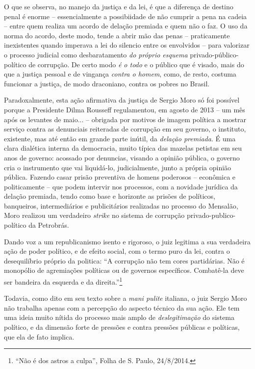 O que se observa, no manejo da justiça e da lei, é que a diferença de
destino penal é enorme -- essencialmente a possibiidade de não cumprir a
pena na cadeia -- entre quem realiza um acordo de delação premiada e
quem não o faz. O uso da norma do acordo, deste modo, tende a abrir mão
das penas -- praticamente inexistentes quando imperava a lei do silencio
entre os envolvidos -- para valorizar o processo judicial como
desbaratamento \emph{do próprio esquema} privado-público-político de
corrupção. De certo modo \emph{é o todo} e o público que é visado, mais
do que a justiça pessoal e de vingança \emph{contra o homem}, como, de
resto, costuma funcionar a justiça, de modo draconiano, contra os pobres
no Brasil.

Paradoxalmente, esta ação afirmativa da justiça de Sergio Moro só foi
possível porque a Presidente Dilma Rousseff regulamentou, em agosto de
2013 -- um mês após os levantes de maio... -- obrigada por motivos de
imagem política a mostrar serviço contra as denunciais reiteradas de
corrupção em seu governo, o instituto, existente, mas até então em
grande parte inútil, da \emph{delação premiada}. É uma clara dialética
interna da democracia, muito típica das mazelas petistas em seu anos de
governo: acossado por denuncias, visando a opinião pública, o governo
cria o instrumento que vai liquidá-lo, judicialmente, junto a própria
opinião pública. Fazendo casar prisão preventiva de homens poderosos --
econômica e politicamente -- que podem intervir nos processos, com a
novidade jurídica da delação premiada, tendo como base e horizonte as
prisões de políticos, banqueiros, intermediários e publicitários
realizadas no processo do Mensalão, Moro realizou um verdadeiro
\emph{strike} no sistema de corrupção privado-publico-político da
Petrobrás.

Dando voz a um republicanismo isento e rigoroso, o juiz legitima a sua
verdadeira ação de poder político, e de efeito social, com o termo puro
da lei, contra o desequilíbrio próprio da politica: ``A corrupção não
tem cores partidárias. Não é monopólio de agremiações políticas ou de
governos específicos. Combatê-la deve ser bandeira da esquerda e da
direita.''\footnote{``Não é dos astros a culpa'', Folha de S. Paulo,
  24/8/2014.}

Todavia, como dito em seu texto sobre a \emph{mani pulite} italiana, o
juiz Sergio Moro não trabalha apenas com a percepção do aspecto técnico
da sua ação. Ele tem uma ideia muito nítida do processo mais amplo de
\emph{deslegitimação} do sistema político, e da dimensão forte de
pressões e contra pressões públicas e políticas, que ela de fato
implica.

